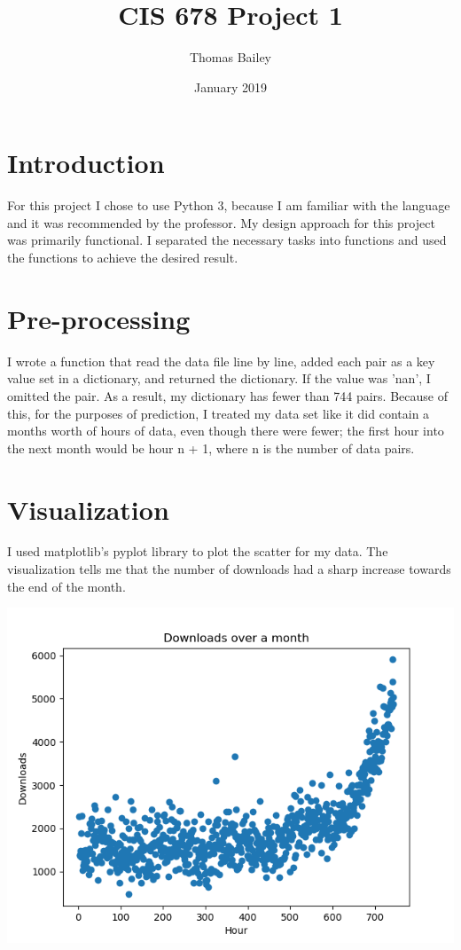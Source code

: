 \documentclass{article}
\title{CIS 678 Project 1}
\author{Thomas Bailey}
\date{January 2019}
\begin{document}
\maketitle

\section{Introduction}

For this project I chose to use Python 3, because I am familiar with the language and it was recommended by the professor. My design approach for this project was primarily functional. I separated the necessary tasks into functions and used the functions to achieve the desired result.

\section{Pre-processing}

I wrote a function that read the data file line by line, added each pair as a key value set in a dictionary, and returned the dictionary. If the value was 'nan', I omitted the pair. As a result, my dictionary has fewer than 744 pairs. Because of this, for the purposes of prediction, I treated my data set like it did contain a months worth of hours of data, even though there were fewer; the first hour into the next month would be hour n + 1, where n is the number of data pairs. 

\section{Visualization}

I used matplotlib's pyplot library to plot the scatter for my data. The visualization tells me that the number of downloads had a sharp increase towards the end of the month.

\includegraphics[scale=0.6]{scatter.png}
\end{document}
